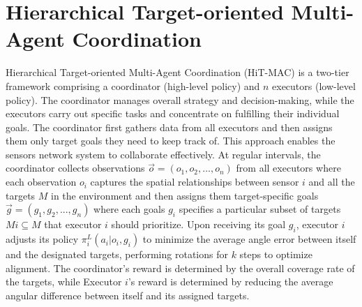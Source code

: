 \documentclass[preprint,12pt]{elsarticle}
\begin{document}


\section{Hierarchical Target-oriented Multi-Agent Coordination}
\label{sec:formulate}
Hierarchical Target-oriented Multi-Agent Coordination (HiT-MAC) is a two-tier framework comprising a coordinator (high-level policy) and $n$ executors (low-level policy). The coordinator manages overall strategy and decision-making, while the executors carry out specific tasks and concentrate on fulfilling their individual goals. The coordinator first gathers data from all executors and then assigns them only target goals they need to keep track of. This approach enables the sensors network system to collaborate effectively.
At regular intervals, the coordinator collects observations $\overset{\rightarrow}{o} = (o_1, o_2, ..., o_n)$ from all executors where each observation $o_i$ captures the spatial relationships between sensor $i$ and all the targets $M$ in the environment and then assigns them target-specific goals $\overset{\rightarrow}{g} = (g_1, g_2, ..., g_n)$ where each goals $g_i$ specifies a particular subset of targets $Mi \subseteq M$ that executor $i$ should prioritize. Upon receiving its goal $g_i$, executor $i$ adjusts its policy $\pi^{L}_i(a_i|o_i, g_i)$ to minimize the average angle error between itself and the designated targets, performing rotations for $k$ steps to optimize alignment. 
The coordinator's reward is determined by the overall coverage rate of the targets, while Executor $i$'s reward is determined by reducing the average angular difference between itself and its assigned targets.
\end{document}
